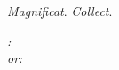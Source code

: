 \ifx\benedicamusdominotex\undefined\else

\emph{Magnificat}. \emph{Collect}.
\medskip

\def\annot{\small{\benedicamusdominotone}}
\gresetfirstlineaboveinitial{\annot}{\annot}
\setsecondannotation{}
\setspaceafterinitial{0mm}
\setspacebeforeinitial{0mm}
\ifx\benedicamusdominointro\undefined\else
\hspace{3ex}\emph{\benedicamusdominointro:}\\
\fi
{}
\ifx\benedicamusdominotexalt\undefined\else
{%
\vspace{0pt plus 12pt}
\ifx\benedicamusdominoaltintro\undefined
\def\benedicamusdominoaltintro{or}\fi
\hspace{3ex}\emph{\benedicamusdominoaltintro:}\\
\def\annot{\small{\benedicamusdominotonealt}}
\gresetfirstlineaboveinitial{\annot}{\annot}
\setsecondannotation{}
\setspaceafterinitial{0mm}
\setspacebeforeinitial{0mm}
\greblockcustos%
}
\fi
\fi



